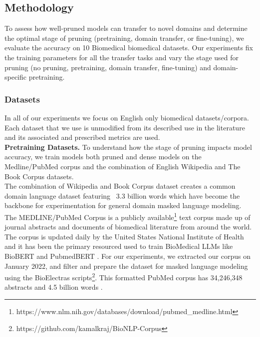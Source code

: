 \subsection{Methodology}
To assess how well-pruned models can transfer to novel domains and determine the optimal stage of pruning (pretraining, domain transfer, or fine-tuning), we evaluate the accuracy on 10 Biomedical biomedical datasets. Our experiments fix the training parameters for all the transfer tasks and vary the stage used for pruning (no pruning, pretraining, domain transfer, fine-tuning) and domain-specific pretraining.
\subsubsection{Datasets}
In all of our experiments we focus on English only biomedical datasets/corpora. Each dataset that we use is unmodified from its described use in the literature and its associated and prescribed metrics are used.\\
\textbf{Pretraining Datasets.} To understand how the stage of pruning impacts model accuracy, we train models both pruned and dense models on the Medline/PubMed corpus and the combination of English Wikipedia \cite{wikidump} and The Book Corpus \cite{Zhu_2015_ICCV} datasets. \\
The combination of Wikipedia and Book Corpus dataset creates a common domain language dataset featuring ~3.3 billion words which have become the backbone for experimentation for general domain masked language modeling. \\
The MEDLINE/PubMed Corpus is a publicly available\footnote{https://www.nlm.nih.gov/databases/download/pubmed\_medline.html} text corpus made up of journal abstracts and documents of biomedical literature from around the world. The corpus is updated daily by the United States National Institute of Health and it has been the primary resourced used to train BioMedical LLMs like BioBERT \cite{Lee2020BioBERTAP} and PubmedBERT \cite{Gu2022DomainSpecificLM}. For our experiments, we extracted our corpus on January 2022, and filter and prepare the dataset for masked language modeling using the BioElectras \cite{Kanakarajan2021BioELECTRAPretrainedBT} scripts\footnote{https://github.com/kamalkraj/BioNLP-Corpus}. This formatted PubMed corpus has 34,246,348 abstracts and 4.5 billion words \cite{Kanakarajan2021BioELECTRAPretrainedBT}. \\

